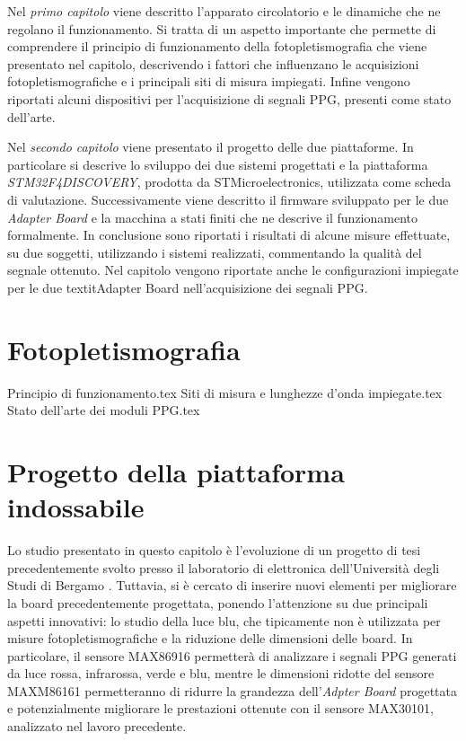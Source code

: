 \documentclass[
	a4paper,
	cleardoublepage=empty,
	headings=twolinechapter,
	numbers=autoenddot,
]{scrbook}
\begin{document}
	Nel \textit{primo capitolo} viene descritto l'apparato circolatorio e le dinamiche che ne regolano il funzionamento. Si tratta di un aspetto importante che permette di comprendere il principio di funzionamento della fotopletismografia che viene presentato nel capitolo, descrivendo i fattori che influenzano le acquisizioni fotopletismografiche e i principali siti di misura impiegati. Infine vengono riportati alcuni dispositivi per l'acquisizione di segnali PPG, presenti come stato dell'arte.
	
	Nel \textit{secondo capitolo} viene presentato il progetto delle due piattaforme. In particolare si descrive lo sviluppo dei due sistemi progettati e la piattaforma \textit{STM32F4DISCOVERY}, prodotta da STMicroelectronics, utilizzata come scheda di valutazione. Successivamente viene descritto il firmware sviluppato per le due \textit{Adapter Board} e la macchina a stati finiti che ne descrive il funzionamento formalmente. In conclusione sono riportati i risultati di alcune misure effettuate, su due soggetti, utilizzando i sistemi realizzati, commentando la qualità del segnale ottenuto. Nel capitolo vengono riportate anche le configurazioni impiegate per le due textit{Adapter Board} nell'acquisizione dei segnali PPG.
	
	\chapter{Fotopletismografia}
	{Principio di funzionamento.tex}
	{Siti di misura e lunghezze d’onda impiegate.tex}
	{Stato dell’arte dei moduli PPG.tex}
	
	\chapter{Progetto della piattaforma indossabile}
	Lo studio presentato in questo capitolo è l'evoluzione di un progetto di tesi precedentemente svolto presso il laboratorio di elettronica dell’Università degli Studi di Bergamo \cite{Ingegneria2018}. Tuttavia, si è cercato di inserire nuovi elementi per migliorare la board precedentemente progettata, ponendo l'attenzione su due principali aspetti innovativi: lo studio della luce blu, che tipicamente non è utilizzata per misure fotopletismografiche e la riduzione delle dimensioni delle board. In particolare, il sensore MAX86916 permetterà di analizzare i segnali PPG generati da luce rossa, infrarossa, verde e blu, mentre le dimensioni ridotte del sensore MAXM86161 permetteranno di ridurre la grandezza dell'\textit{Adpter Board} progettata e potenzialmente migliorare le prestazioni ottenute con il sensore MAX30101, analizzato nel lavoro precedente\cite{Ingegneria2018}.
	
\end{document}
